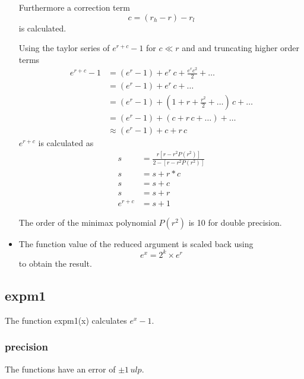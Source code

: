\documentclass[10pt,a4paper,wide]{article}
\numberwithin{equation}{subsection}
\begin{document}
\begin{itemize}
    Furthermore a correction term
    \[
        c = (r_h - r) - r_l
    \]
    is calculated.

    Using the taylor series of $e^{r+c}-1$ for $c \ll r$ and and truncating
    higher order terms
    \begin{equation}
        \label{equ:expm1-taylor}
        \begin{aligned}
            e^{r+c}-1 &= (e^r-1) + e^r\,c  + \frac{e^r c^2}{2} + \dots \\
                      &= (e^r-1) + e^r\,c  + \dots \\
                      &= (e^r-1) + (1+r+\frac{r^2}{2}+\dots)\,c + \dots \\
                      &= (e^r-1) + (c + r\,c + \dots) + \dots \\
                      &\approx (e^r-1) + c + r\,c
        \end{aligned}
    \end{equation}
    $e^{r+c}$ is calculated as
    \begin{equation}
        \begin{aligned}
            s &= \frac{r [r -r^2 P(r^2)]} {2-[r-r^2P(r^2)]} \\
            s &= s + r*c \\
            s &= s + c \\
            s &= s + r \\
            e^{r+c} &= s + 1
        \end{aligned}
    \end{equation}

    The order of the minimax polynomial $P(r^2)$ is 10 for double precision.

\item The function value of the reduced argument is scaled back using
    \begin{equation}
        e^x = 2^k \times e^r
    \end{equation}
    to obtain the result.

\end{itemize}


\subsection{expm1}
\label{sub_sec:expm1}
The function expm1(x) calculates $ e^x-1 $.

\subsubsection{precision}
The functions have an error of $ \pm 1\, ulp$.
\end{document}
